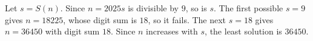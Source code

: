 Let $s=S(n)$. Since $n=2025s$ is divisible by $9$, so is $s$. The first possible $s=9$ gives $n=18225$, whose digit sum is $18$, so it fails. The next $s=18$ gives $n=36450$ with digit sum $18$. Since $n$ increases with $s$, the least solution is $\boxed{36450}$.
